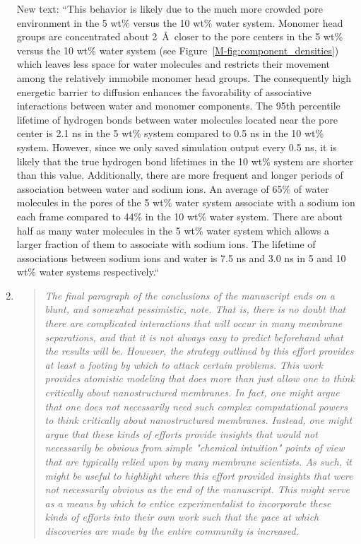 \documentclass{article}
\begin{document}
\begin{enumerate}
    New text: ``This behavior is likely due to the
    much more crowded pore environment in the 5 wt\% versus the 10 wt\% water system. 
    Monomer head groups are concentrated about 2~\AA~closer to the pore centers in the
    5 wt\% versus the 10 wt\% water system (see Figure~\ref{M-fig:component_densities})
    which leaves less space for water molecules and restricts their movement among the 
    relatively immobile monomer head groups. The consequently high energetic barrier 
    to diffusion enhances the favorability of associative interactions between water
    and monomer components. The 95th percentile lifetime of hydrogen bonds between 
    water molecules located near the pore center is 2.1 ns in the 5 wt\% system compared
    to 0.5 ns in the 10 wt\% system. However, since we only saved simulation output 
    every 0.5 ns, it is likely that the true hydrogen bond lifetimes in the 10 wt\% 
    system are shorter than this value. Additionally, there are more frequent and longer
    periods of association between water and sodium ions. An average of 65\% of water 
    molecules in the pores of the 5 wt\% water system associate with a sodium ion each
    frame compared to 44\% in the 10 wt\% water system. There are about half as many water
    molecules in the 5 wt\% water system which allows a larger fraction of them to 
    associate with sodium ions. The lifetime of associations between sodium ions and 
    water is 7.5 ns and 3.0 ns in 5 and 10 wt\% water systems respectively.``
	
    \item \begin{quote}
    \textit{The final paragraph of the conclusions of the manuscript ends on a blunt, and 
    somewhat pessimistic, note. That is, there is no doubt that there are complicated 
    interactions that will occur in many membrane separations, and that it is not always 
    easy to predict beforehand what the results will be. However, the strategy outlined 
    by this effort provides at least a footing by which to attack certain problems. This
    work provides atomistic modeling that does more than just allow one to think critically
    about nanostructured membranes. In fact, one might argue that one does not necessarily
    need such complex computational powers to think critically about nanostructured 
    membranes. Instead, one might argue that these kinds of efforts provide insights that
    would not necessarily be obvious from simple "chemical intuition" points of view that 
    are typically relied upon by many membrane scientists. As such, it might be useful to
    highlight where this effort provided insights that were not necessarily obvious as the
    end of the manuscript. This might serve as a means by which to entice experimentalist
    to incorporate these kinds of efforts into their own work such that the pace at which
    discoveries are made by the entire community is increased.}
    \end{quote}
	

\end{enumerate}
\end{document}
